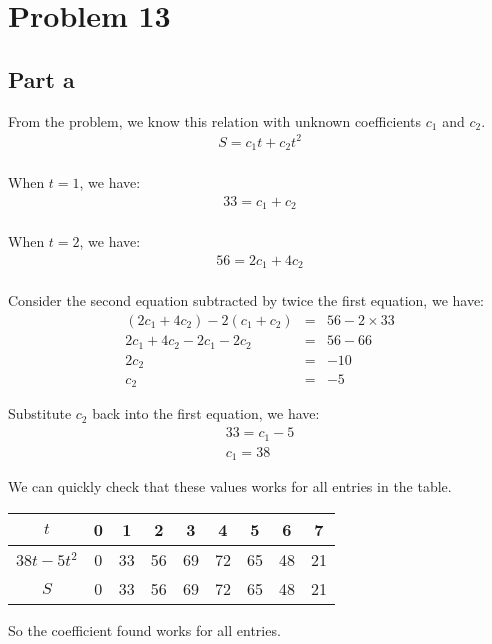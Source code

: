 \section*{Problem 13}
\subsection*{Part a}
From the problem, we know this relation with unknown coefficients $ c_1 $ and $ c_2 $.
\begin{eqnarray*}
  S = c_1 t + c_2 t^2 \\
\end{eqnarray*}

When $ t = 1 $, we have:
\begin{eqnarray*}
  33 = c_1 + c_2 \\
\end{eqnarray*}


When $ t = 2 $, we have:
\begin{eqnarray*}
  56 = 2 c_1 + 4 c_2 \\
\end{eqnarray*}

Consider the second equation subtracted by twice the first equation, we have:
\begin{eqnarray*}
  (2 c_1 + 4 c_2) - 2(c_1 + c_2) &=& 56 - 2 \times 33 \\
   2 c_1 + 4 c_2 - 2 c_1 - 2 c_2 &=& 56 - 66          \\
                           2 c_2 &=& -10              \\
                              c_2 &=& -5
\end{eqnarray*}

Substitute $ c_2 $ back into the first equation, we have:
\begin{eqnarray*}
  33 = c_1 - 5 \\
  c_1 = 38
\end{eqnarray*}

We can quickly check that these values works for all entries in the table.
\begin{center}
  \begin{tabular}{ |c|c|c|c|c|c|c|c|c| }
    \hline
    $ t          $ & 0 & 1  & 2  & 3  & 4  & 5  & 6  & 7 \\
    \hline
    $ 38t - 5t^2 $ & 0 & 33 & 56 & 69 & 72 & 65 & 48 & 21 \\
    \hline
    $ S          $ & 0 & 33 & 56 & 69 & 72 & 65 & 48 & 21 \\
    \hline
  \end{tabular}
\end{center}
So the coefficient found works for all entries.
